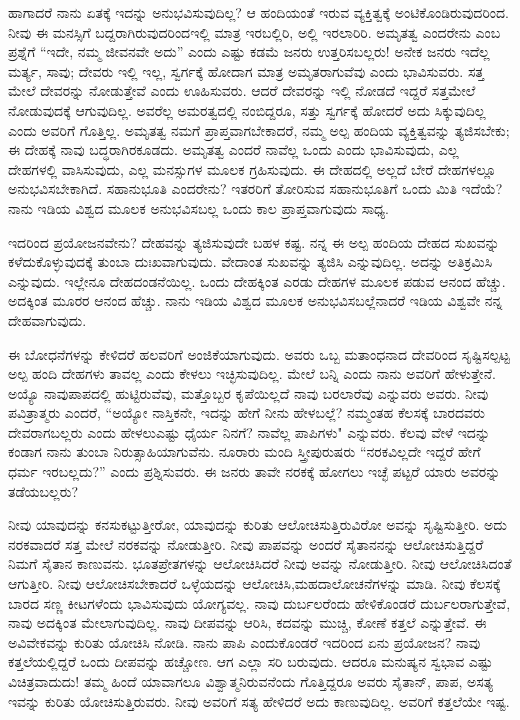 \vskip -2pt

ಹಾಗಾದರೆ ನಾನು ಏತಕ್ಕೆ ಇದನ್ನು ಅನುಭವಿಸುವುದಿಲ್ಲ? ಆ ಹಂದಿಯಂತೆ ಇರುವ ವ್ಯಕ್ತಿತ್ವಕ್ಕೆ ಅಂಟಿಕೊಂಡಿರುವುದರಿಂದ. ನೀವು ಈ ಮನಸ್ಸಿಗೆ ಬದ್ದರಾಗಿರುವುದರಿಂದ\break ಇಲ್ಲಿ ಮಾತ್ರ ಇರಬಲ್ಲಿರಿ, ಅಲ್ಲಿ ಇರಲಾರಿರಿ. ಅಮೃತತ್ವ ಎಂದರೇನು ಎಂಬ ಪ್ರಶ್ನೆಗೆ “ಇದೇ, ನಮ್ಮ ಜೀವನವೇ ಅದು'' ಎಂದು ಎಷ್ಟು ಕಡಮೆ ಜನರು ಉತ್ತರಿಸಬಲ್ಲರು! ಅನೇಕ ಜನರು ಇದೆಲ್ಲ ಮರ್ತ್ಯ, ಸಾವು; ದೇವರು ಇಲ್ಲಿ ಇಲ್ಲ, ಸ್ವರ್ಗಕ್ಕೆ ಹೋದಾಗ ಮಾತ್ರ ಅಮೃತರಾಗುವೆವು ಎಂದು ಭಾವಿಸುವರು. ಸತ್ತ ಮೇಲೆ ದೇವರನ್ನು ನೋಡುತ್ತೇವೆ ಎಂದು ಊಹಿಸುವರು. ಆದರೆ ದೇವರನ್ನು ಇಲ್ಲಿ ನೋಡದೆ ಇದ್ದರೆ ಸತ್ತಮೇಲೆ ನೋಡುವುದಕ್ಕೆ ಆಗುವುದಿಲ್ಲ. ಅವರೆಲ್ಲ ಅಮರತ್ವದಲ್ಲಿ ನಂಬಿದ್ದರೂ, ಸತ್ತು ಸ್ವರ್ಗಕ್ಕೆ ಹೋದರೆ ಅದು ಸಿಕ್ಕುವುದಿಲ್ಲ ಎಂದು ಅವರಿಗೆ ಗೊತ್ತಿಲ್ಲ. ಅಮೃತತ್ವ ನಮಗೆ ಪ್ರಾಪ್ತವಾಗಬೇಕಾದರೆ, ನಮ್ಮ ಅಲ್ಪ ಹಂದಿಯ ವ್ಯಕ್ತಿತ್ವವನ್ನು ತ್ಯಜಿಸಬೇಕು; ಈ ದೇಹಕ್ಕೆ ನಾವು ಬದ್ಧರಾಗಿರಕೂಡದು. ಅಮೃತತ್ವ ಎಂದರೆ ನಾವೆಲ್ಲ ಒಂದು ಎಂದು ಭಾವಿಸುವುದು, ಎಲ್ಲ ದೇಹಗಳಲ್ಲಿ ವಾಸಿಸುವುದು, ಎಲ್ಲ ಮನಸ್ಸುಗಳ ಮೂಲಕ ಗ್ರಹಿಸುವುದು. ಈ ದೇಹದಲ್ಲಿ ಅಲ್ಲದೆ ಬೇರೆ ದೇಹಗಳಲ್ಲೂ ಅನುಭವಿಸಬೇಕಾಗಿದೆ. ಸಹಾನುಭೂತಿ ಎಂದರೇನು? ಇತರರಿಗೆ ತೋರಿಸುವ ಸಹಾನುಭೂತಿಗೆ ಒಂದು ಮಿತಿ ಇದೆಯೆ? ನಾನು ಇಡಿಯ ವಿಶ್ವದ ಮೂಲಕ ಅನುಭವಿಸಬಲ್ಲ ಒಂದು ಕಾಲ ಪ್ರಾಪ್ತವಾಗುವುದು ಸಾಧ್ಯ.

ಇದರಿಂದ ಪ್ರಯೋಜನವೇನು? ದೇಹವನ್ನು ತ್ಯಜಿಸುವುದೇ ಬಹಳ ಕಷ್ಟ. ನನ್ನ ಈ ಅಲ್ಪ ಹಂದಿಯ ದೇಹದ ಸುಖವನ್ನು ಕಳೆದುಕೊಳ್ಳುವುದಕ್ಕೆ ತುಂಬಾ ದುಃಖವಾಗುವುದು. ವೇದಾಂತ ಸುಖವನ್ನು ತ್ಯಜಿಸಿ ಎನ್ನುವುದಿಲ್ಲ. ಅದನ್ನು ಅತಿಕ್ರಮಿಸಿ ಎನ್ನುವುದು. ಇಲ್ಲೇನೂ ದೇಹದಂಡನೆಯಿಲ್ಲ. ಒಂದು ದೇಹಕ್ಕಿಂತ ಎರಡು ದೇಹಗಳ ಮೂಲಕ ಪಡುವ ಆನಂದ ಹೆಚ್ಚು. ಅದಕ್ಕಿಂತ ಮೂರರ ಆನಂದ ಹೆಚ್ಚು. ನಾನು ಇಡಿಯ ವಿಶ್ವದ ಮೂಲಕ ಅನುಭವಿಸಬಲ್ಲೆನಾದರೆ ಇಡಿಯ ವಿಶ್ವವೇ ನನ್ನ ದೇಹವಾಗುವುದು.

\vskip -2pt

ಈ ಬೋಧನೆಗಳನ್ನು ಕೇಳಿದರೆ ಹಲವರಿಗೆ ಅಂಜಿಕೆಯಾಗುವುದು. ಅವರು ಒಬ್ಬ ಮತಾಂಧನಾದ ದೇವರಿಂದ ಸೃಷ್ಟಿಸಲ್ಪಟ್ಟ ಅಲ್ಪ ಹಂದಿ ದೇಹಗಳು ತಾವಲ್ಲ ಎಂದು ಕೇಳಲು ಇಚ್ಛಿಸುವುದಿಲ್ಲ. ಮೇಲೆ ಬನ್ನಿ ಎಂದು ನಾನು ಅವರಿಗೆ ಹೇಳುತ್ತೇನೆ. ಅಯ್ಯೊ ನಾವು\break ಪಾಪದಲ್ಲಿ ಹುಟ್ಟಿರುವೆವು, ಮತ್ತೊಬ್ಬರ ಕೃಪೆಯಿಲ್ಲದೆ ನಾವು ಬರಲಾರೆವು ಎನ್ನುವರು ಅವರು. ನೀವು ಪವಿತ್ರಾತ್ಮರು ಎಂದರೆ, “ಅಯ್ಯೋ ನಾಸ್ತಿಕನೇ, ಇದನ್ನು ಹೇಗೆ ನೀನು ಹೇಳಬಲ್ಲೆ? ನಮ್ಮಂತಹ ಕೆಲಸಕ್ಕೆ ಬಾರದವರು ದೇವರಾಗಬಲ್ಲರು ಎಂದು ಹೇಳಲು\break ಎಷ್ಟು ಧೈರ್ಯ ನಿನಗೆ? ನಾವೆಲ್ಲ ಪಾಪಿಗಳು" ಎನ್ನುವರು. ಕೆಲವು ವೇಳೆ ಇದನ್ನು ಕಂಡಾಗ ನಾನು ತುಂಬಾ ನಿರುತ್ಸಾಹಿಯಾಗುವೆನು. ನೂರಾರು ಮಂದಿ ಸ್ತ್ರೀಪುರುಷರು “ನರಕವಿಲ್ಲದೇ ಇದ್ದರೆ ಹೇಗೆ ಧರ್ಮ ಇರಬಲ್ಲದು?'' ಎಂದು ಪ್ರಶ್ನಿಸುವರು. ಈ ಜನರು ತಾವೇ ನರಕಕ್ಕೆ ಹೋಗಲು ಇಚ್ಛೆ ಪಟ್ಟರೆ ಯಾರು ಅವರನ್ನು ತಡೆಯಬಲ್ಲರು?

ನೀವು ಯಾವುದನ್ನು ಕನಸುಕಟ್ಟುತ್ತೀರೋ, ಯಾವುದನ್ನು ಕುರಿತು ಆಲೋಚಿಸುತ್ತಿರುವಿರೋ ಅವನ್ನು ಸೃಷ್ಟಿಸುತ್ತೀರಿ. ಅದು ನರಕವಾದರೆ ಸತ್ತ ಮೇಲೆ ನರಕವನ್ನು ನೋಡುತ್ತೀರಿ. ನೀವು ಪಾಪವನ್ನು ಅಂದರೆ ಸೈತಾನನನ್ನು ಆಲೋಚಿಸುತ್ತಿದ್ದರೆ ನಿಮಗೆ ಸೈತಾನ ಕಾಣುವನು. ಭೂತಪ್ರೇತಗಳನ್ನು ಆಲೋಚಿಸಿದರೆ ನೀವು ಅವನ್ನು ನೋಡುತ್ತೀರಿ. ನೀವು ಆಲೋಚಿಸಿದಂತೆ ಆಗುತ್ತೀರಿ. ನೀವು ಆಲೋಚಿಸಬೇಕಾದರೆ ಒಳ್ಳೆಯದನ್ನು ಆಲೋಚಿಸಿ,\break ಮಹದಾಲೋಚನೆಗಳನ್ನು ಮಾಡಿ. ನೀವು ಕೆಲಸಕ್ಕೆ ಬಾರದ ಸಣ್ಣ ಕೀಟಗಳೆಂದು ಭಾವಿಸುವುದು ಯೋಗ್ಯವಲ್ಲ. ನಾವು ದುರ್ಬಲರೆಂದು ಹೇಳಿಕೊಂಡರೆ ದುರ್ಬಲರಾಗುತ್ತೇವೆ, ನಾವು ಅದಕ್ಕಿಂತ ಮೇಲಾಗುವುದಿಲ್ಲ. ನಾವು ದೀಪವನ್ನು ಆರಿಸಿ, ಕದವನ್ನು ಮುಚ್ಚಿ, ಕೋಣೆ ಕತ್ತಲೆ ಎನ್ನುತ್ತೇವೆ. ಈ ಅವಿವೇಕವನ್ನು ಕುರಿತು ಯೋಚಿಸಿ ನೋಡಿ. ನಾನು ಪಾಪಿ ಎಂದುಕೊಂಡರೆ ಇದರಿಂದ ಏನು ಪ್ರಯೋಜನ? ನಾವು ಕತ್ತಲೆಯಲ್ಲಿದ್ದರೆ ಒಂದು ದೀಪವನ್ನು ಹಚ್ಚೋಣ. ಆಗ ಎಲ್ಲಾ ಸರಿ ಬರುವುದು. ಆದರೂ ಮನುಷ್ಯನ ಸ್ವಭಾವ ಎಷ್ಟು ವಿಚಿತ್ರವಾದುದು! ತಮ್ಮ ಹಿಂದೆ ಯಾವಾಗಲೂ ವಿಶ್ವಾತ್ಮನಿರುವನೆಂದು ಗೊತ್ತಿದ್ದರೂ ಅವರು ಸೈತಾನ್, ಪಾಪ, ಅಸತ್ಯ ಇವನ್ನು ಕುರಿತು ಯೋಚಿಸುತ್ತಿರುವರು. ನೀವು ಅವರಿಗೆ ಸತ್ಯ ಹೇಳಿದರೆ ಅದು ಕಾಣುವುದಿಲ್ಲ. ಅವರಿಗೆ ಕತ್ತಲೆಯೇ ಇಷ್ಟ.

